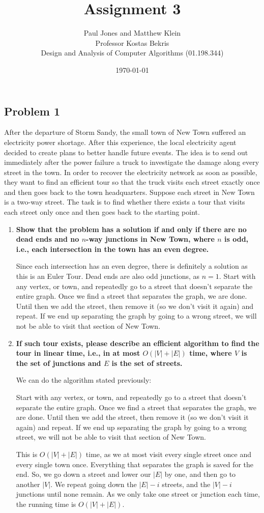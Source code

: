\documentclass[11pt]{article}
\title{Assignment 3}
\author{Paul Jones and Matthew Klein \\
		Professor Kostas Bekris\\
		Design and Analysis of Computer Algorithms (01.198.344)}
\date{\today}
\begin{document}
\subsection*{Problem 1} After the departure of Storm
Sandy, the small town of New Town suffered an electricity power
shortage. After this experience, the local electricity agent decided
to create plans to better handle future events. The idea is to send
out immediately after the power failure a truck to investigate the
damage along every street in the town. In order to recover the
electricity network as soon as possible, they want to find an
efficient tour so that the truck visits each street exactly once and
then goes back to the town headquarters. Suppose each street in New
Town is a two-way street. The task is to find whether there exists a
tour that visits each street only once and then goes back to the
starting point.\\

\begin{enumerate}[label=\textbf{\Alph*.}]
\item  \textbf{Show that the problem has a solution if and only if
there are no dead ends and no $n$-way junctions in New Town, where $n$
is odd, i.e., each intersection in the town has an even degree.}

Since each intersection has an even degree, there is definitely a solution as this is an Euler Tour. Dead ends are also odd junctions, as $n = 1$. Start with any vertex, or town, and repeatedly go to a street that doesn't separate the entire graph. Once we find a street that separates the graph, we are done. Until then we add the street, then remove it (so we don't visit it again) and repeat. If we end up separating the graph by going to a wrong street, we will not be able to visit that section of New Town.

\item  \textbf{If such tour exists, please describe an efficient
algorithm to find the tour in linear time, i.e., in at most $O(|V| +
|E|)$ time, where $V$ is the set of junctions and $E$ is the set of
streets.}

We can do the algorithm stated previously:

Start with any vertex, or town, and repeatedly go to a street that doesn't separate the entire graph. Once we find a street that separates the graph, we are done. Until then we add the street, then remove it (so we don't visit it again) and repeat. If we end up separating the graph by going to a wrong street, we will not be able to visit that section of New Town.

This is $O(|V| + |E|)$ time, as we at most visit every single street once and every single town once. Everything that separates the graph is saved for the end. So, we go down a street and lower our $|E|$ by one, and then go to another $|V|$. We repeat going down the $|E|-i$ streets, and the $|V|-i$ junctions until none remain. As we only take one street or junction each time, the running time is $O(|V| + |E|)$.

\end{enumerate}
\end{document}

